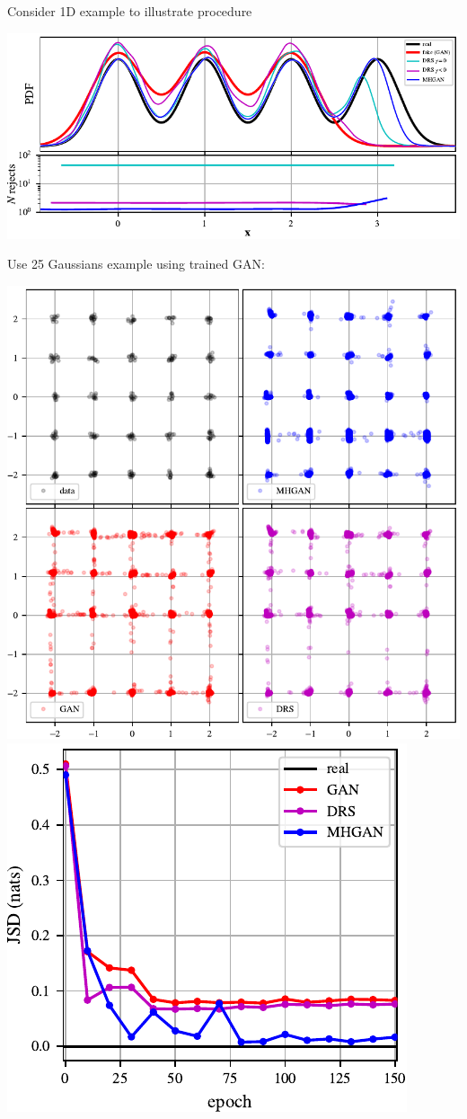 \documentclass[a0,landscape]{a0poster}
\begin{document}
\begin{multicols}{3}
Consider 1D example to illustrate procedure
\begin{center}
\includegraphics[scale=2.5]{../figures/univariate_example.pdf}
\end{center}
Use 25 Gaussians example using trained GAN:
\begin{center}
\includegraphics[scale=1.0]{../figures/mog_example_150.pdf}
\hspace{7mm}
\includegraphics[scale=2.0]{../figures/jsd.pdf}

\end{center}
\end{multicols}
\end{document}
